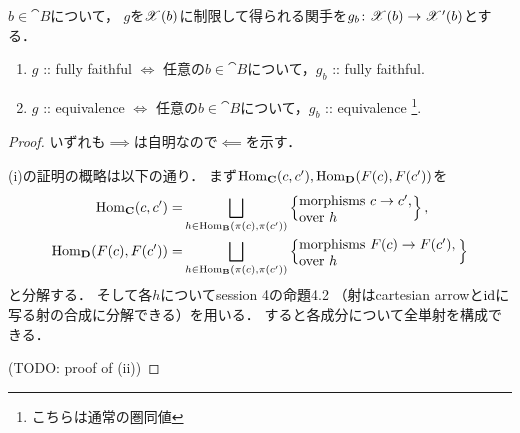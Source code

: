 \documentclass[a4paper, dvipdfmx]{jsarticle}
\begin{document}
    \begin{Prop}
        $b \in \cat{B}$について，
        $g$を$\mathscr{X}(b)$に制限して得られる関手を$g_b \colon \mathscr{X}(b) \to \mathscr{X}'(b)$とする．
        \begin{enumerate}[label=(\alph*)]
        \item $g$ :: fully faithful
                $\iff$ 任意の$b \in \cat{B}$について，$g_{b}$ :: fully faithful.
        \item $g$ :: equivalence
                $\iff$ 任意の$b \in \cat{B}$について，$g_{b}$ :: equivalence
                    \footnote{こちらは通常の圏同値}.
    \end{enumerate}
    \end{Prop}
    \begin{proof}
        いずれも$\implies$は自明なので$\impliedby$を示す．

        (i)の証明の概略は以下の通り．
        まず$\operatorname{Hom}_{\mathbf{C}}(c, c'), \operatorname{Hom}_{\mathbf{D}}(F(c), F(c'))$を
        \begin{align*}
            \Hom_{\cat{C}}(c, c')
            =&\bigsqcup_{h \in \Hom_{\cat{B}}(\pi(c), \pi(c'))}
            \left\{\parbox{2.85cm}{morphisms $c \to c'$, \\ \qquad\ \ over $h$}\right\}, \\
            \Hom_{\cat{D}}(F(c), F(c'))
            =&\bigsqcup_{h \in \Hom_{\cat{B}}(\pi(c), \pi(c'))}
            \left\{\parbox{4cm}{morphisms $F(c) \to F(c')$, \\ \qquad\qquad\ over $h$}\right\}
        \end{align*}
        と分解する．
        そして各$h$についてsession 4の命題4.2
        （射はcartesian arrowと$\mathrm{id}_{\!}$に写る射の合成に分解できる）を用いる．
        すると各成分について全単射を構成できる．

        (TODO: proof of (ii))
    \end{proof}



\end{document}
